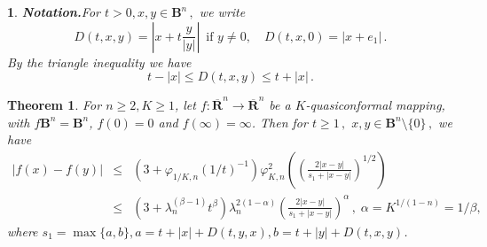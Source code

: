 \documentclass[12pt,a4paper,leqno]{amsart}
\theoremstyle{plain}
\newtheorem{theorem}[equation]{Theorem}
\newtheorem{subsec}[equation]{}
\numberwithin{equation}{section}          %
\begin{document}
\begin{subsec}{\bf Notation.}\label{6b} {\rm For $t>0, x,y \in \mathbf{B}^n\,,$ we write
$$ D(t,x,y)=|x+t\frac{y}{|y|}| \,\,\, \mathrm{if \,\,} y \neq 0,\quad  D(t,x,0)=|x+ e_1|\,.$$
By the triangle inequality we have}
\begin{equation}\label{6c}
t- |x|\le D(t,x,y) \le t+ |x|\,.
\end{equation}
\end{subsec}

\begin{theorem}\label{7a} For $n\geq 2,K\geq 1$, let $f:\overline{\mathbf{R}}^n\to\overline{\mathbf{R}}^n$
be a $K$-quasiconformal mapping, with
$f\mathbf{B}^n=\mathbf{B}^n$, $f(0)=0$ and $f(\infty)=\infty$.
Then for $t\ge 1\,,$ $x,y\in \mathbf{B}^n\setminus \{0\}\,,$ we have
\begin{eqnarray*}
|f(x)-f(y)|&\leq &(3+\varphi_{1/K,n}(1/t)^{-1})
\varphi_{K,n}^2\left(\left(\frac{2|x-y|}{s_1+|x-y|}\right)^{1/2}\right)\\
          &\leq & (3+\lambda_{n}^{(\beta-1)}t^\beta)\lambda_n^{2(1-\alpha)}\left(\frac{2|x-y|}{s_1+|x-y|}\right)^\alpha\,,\;
          \alpha=K^{1/(1-n)}=1/\beta,
\end{eqnarray*}
where $s_1=\displaystyle\max\{a,b \}, a=t+|x|+ D(t,y,x),
b=t+|y|+D(t,x,y)$. %
\end{theorem}
\end{document}
